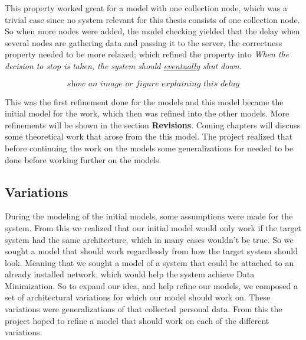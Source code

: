 This property worked great for a model with one collection node, which was a trivial case since no system relevant for this thesis consists of one collection node. So when more nodes were added, the model checking yielded that the delay when several nodes are gathering data and passing it to the server, the correctness property needed to be more relaxed; which refined the property into \textit{When the decision to stop is taken, the system should \underline{eventually} shut down}. 

\[ \textit{show an image or figure explaining this delay} \]

This was the first refinement done for the models and this model became the initial model for the work, which then was refined into the other models. More refinements will be shown in the section \textbf{Revisions}. Coming chapters will discuss some theoretical work that arose from the this model. The project realized that before continuing the work on the models some generalizations for \wsn needed to be done before working further on the models.


\subsection{Variations}



During the modeling of the initial models, some assumptions were made for the system. From this we realized that our initial model would only work if the target system had the same architecture, which in many cases wouldn't be true. So we sought a model that should work regardlessly from how the target system should look. Meaning that we sought a model of a system that could be attached to an already installed network, which would help the system achieve Data Minimization. So to expand our idea, and help refine our models, we composed a set of architectural variations for \wsns which our model should work on. These variations were generalizations of \wsns that collected personal data. From this the project hoped to refine a model that should work on each of the different variations. \\

